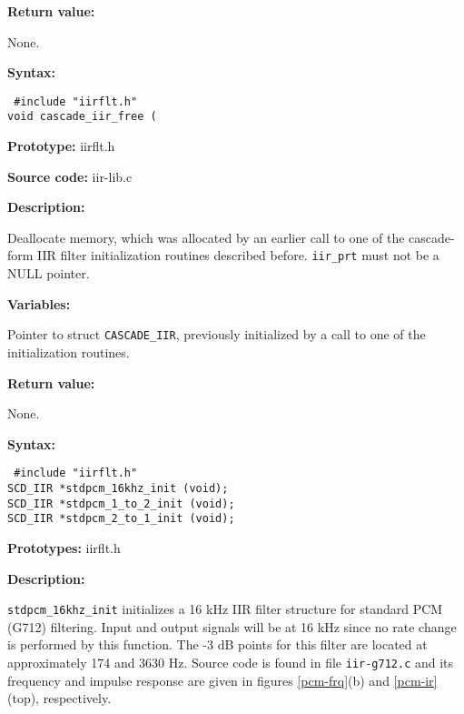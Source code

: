{\bf Return value: }

None.

\newpage


{\bf Syntax: }

{\tt
\#include "iirflt.h"\\
void cascade\_iir\_free (
}

{\bf Prototype: }    iirflt.h

{\bf Source code: }  iir-lib.c

{\bf Description: }

Deallocate memory, which was allocated by an earlier call to one of
the cascade-form IIR filter initialization routines described before.
{\tt iir\_prt} must not be a NULL pointer.

{\bf Variables: }
\begin{Descr}{\DescrLen}
\item[\pbox{20mm}{\em iir\_ptr}] %
        Pointer to struct {\tt CASCADE\_IIR}, previously initialized
        by a call to one of the initialization routines.
\end{Descr}


{\bf Return value: }

None.



{\bf Syntax: }

{\tt
\#include "iirflt.h"\\
SCD\_IIR *stdpcm\_16khz\_init (void);\\
SCD\_IIR *stdpcm\_1\_to\_2\_init (void);\\
SCD\_IIR *stdpcm\_2\_to\_1\_init (void);
}

{\bf Prototypes: }   iirflt.h

{\bf Description: }

{\tt stdpcm\_16khz\_init} initializes a 16 kHz IIR filter structure
for standard PCM (G712) filtering. Input and output signals will be at
16 kHz since no rate change is performed by this function. The -3 dB
points for this filter are located at approximately 174 and 3630 Hz.
Source code is found in file {\tt iir-g712.c} and its frequency and
impulse response are given in figures \ref{pcm-frq}(b) and
\ref{pcm-ir} (top), respectively.

